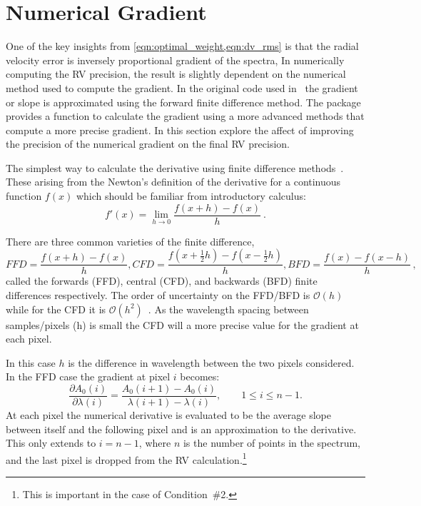 \section{Numerical Gradient}
\label{sec:numerical_gradient}
One of the key insights from \cref{eqn:optimal_weight,eqn:dv_rms} is that the radial velocity error is inversely proportional gradient of the spectra, In numerically computing the {RV} precision, the result is slightly dependent on the numerical method used to compute the gradient.
In the original code used in~\citet{figueira_radial_2016} the gradient or slope is approximated using the forward finite difference method.
The \numpy{} package provides a function to calculate the gradient using a more advanced methods that compute a more precise gradient.
In this section  explore the affect of improving the precision of the numerical gradient on the final {RV} precision.

The simplest way to calculate the derivative using finite difference methods~\citep{quarteroni_numerical_2000}.
These arising from the Newton's definition of the derivative for a continuous function \(f(x)\) which should be familiar from introductory calculus:
\[f'(x) = \lim_{h \to 0} \frac{f(x+h)-f(x)}{h}~.\]

There are three common varieties of the finite difference,
\begin{equation}
{FFD} = \frac{f(x+h)-f(x)}{h}, {CFD}=\frac{f(x+\frac{1}{2}h)-f(x-\frac{1}{2}h)}{h}, {BFD}=\frac{f(x)-f(x-h)}{h}\,,
\end{equation}
called the forwards ({FFD}), central ({CFD}), and backwards ({BFD}) finite differences respectively.
The order of uncertainty on the {FFD}/{BFD} is \(\mathcal{O}(h)\) while for the {CFD} it is \(\mathcal{O}({h}^{2})\)~\citep{quarteroni_numerical_2000}.
As the wavelength spacing between samples/pixels (h) is small the {CFD} will a more precise value for the gradient at each pixel.

In this case \(h\) is the difference in wavelength between the two pixels considered.
In the {FFD} case the gradient at pixel \(i\) becomes:
\begin{equation}
\frac{\partial {A}_{0}(i)}{\partial\lambda(i)} = \frac{{A}_{0}(i+1) - {A}_{0}(i)}{\lambda(i+1)-\lambda(i)}, \hspace{2em} 1 \leq i \leq n-1.
\label{eqn:ffd_precision}
\end{equation}
At each pixel the numerical derivative is evaluated to be the average slope between itself and the following pixel and is an approximation to the derivative.
This only extends to \(i= n-1\), where \(n\) is the number of points in the spectrum, and the last pixel is dropped from the {RV} calculation.\footnote{This is important in the case of Condition~\#2.}


